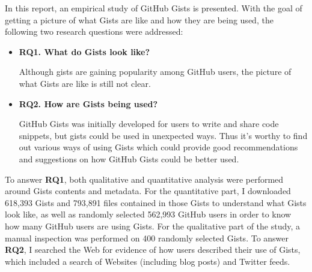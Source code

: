 In this report, an empirical study of GitHub Gists is presented. With the goal of getting a picture of what Gists are like and how they are being used, the following two research questions were addressed:

\begin{itemize}

  \item {\bf RQ1. What do Gists look like?}
  
  Although gists are gaining popularity among GitHub users, the picture of what Gists are like is still not clear. 

  \item {\bf RQ2. How are Gists being used?}
  
  GitHub Gists was initially developed for users to write and share code snippets, but gists could be used in unexpected ways. Thus it's worthy to find out various ways of using Gists which could provide good recommendations and suggestions on how GitHub Gists could be better used.
  
\end{itemize}
To answer {\bf RQ1}, both qualitative and quantitative analysis were performed around Gists contents and metadata. For the quantitative part, I downloaded 618,393 Gists and 793,891 files contained in those Gists to understand what Gists look like, as well as randomly selected 562,993 GitHub users in order to know how many GitHub users are using Gists. For the qualitative part of the study, a manual inspection was performed on 400 randomly selected Gists. To answer {\bf RQ2}, I searched the Web for evidence of how users described their use of Gists, which included a search of Websites (including blog posts) and Twitter feeds.
